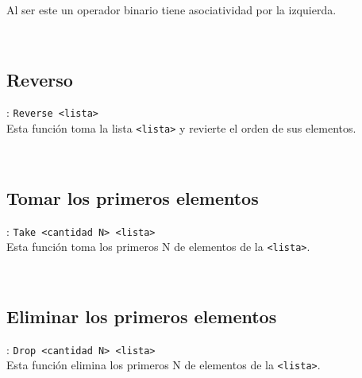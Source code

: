       Al ser este un operador binario tiene asociatividad por la izquierda.
      
      \begin{fxcode}
         \arrowcode{[1, 2] ++ [3, 4] ++ [4, 5]}\\
         \outcode{[1, 2, 3, 4, 4, 5]}
      \end{fxcode}
      
      \subsection*{Reverso}: \texttt{Reverse <lista>}\\
      Esta función toma la lista \texttt{<lista>} y revierte el orden de sus elementos.
      
      \begin{fxcode}
         \\
      \end{fxcode}
      
      \subsection*{Tomar los primeros elementos}: \texttt{Take <cantidad N>~<lista>}\\
      Esta función toma los primeros N de elementos de la \texttt{<lista>}.
      
      \begin{fxcode}
         \\
      \end{fxcode}
      
      \subsection*{Eliminar los primeros elementos}: \texttt{Drop <cantidad N>~<lista>}\\
      Esta función elimina los primeros N de elementos de la \texttt{<lista>}.
      
      \begin{fxcode}
         \\
      \end{fxcode}
      
